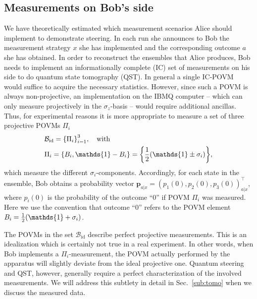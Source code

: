 \documentclass[aps,pra,twocolumn,superscriptaddress,showemail,showpacs,longbibliography]{revtex4-2}
\newcommand{\id}{\mathds{1}} %
\renewcommand{\vec}{\mathbf}
\begin{document}
\subsection{Measurements on Bob's side}
\label{sub:measurements-bob}
We have theoretically estimated which measurement scenarios Alice should implement to demonstrate steering. In each run she announces to Bob the measurement strategy $x$ she has implemented and the corresponding outcome $a$ she has obtained. In order to reconstruct the ensembles that Alice produces, Bob needs to implement an informationally complete (IC) set of measurements on his side to do quantum state tomography (QST). In general a single IC-POVM would suffice to acquire the necessary statistics. However, since such a POVM is always non-projective, an implementation on the IBMQ computer -- which can only measure projectively in the $\sigma_z$-basis --  would require additional ancillas. Thus, for experimental reasons it is more appropriate to measure a set of three projective POVMs $\Pi_i$
\begin{align}
\label{eq:ideal}
    & \mathcal{B}_\text{id} = \qty{\Pi_i}_{i=1}^3,\quad \textrm{with}\\
    & \Pi_i = \qty{B_i, \id-B_i} =  \qty{\frac{1}{2} \qty(\id \pm \sigma_i)}, %
\end{align}
which measure the different $\sigma_i$-components. Accordingly, for each state in the ensemble, Bob obtains a probability vector $\vec p_{a|x} = (p_1(0),p_2(0),p_3(0))^\intercal_{a|x}$, where $p_i(0)$ is the probability of the outcome ``0'' if POVM $\Pi_i$ was measured. Here we use the convention that outcome ``0'' refers to the POVM element $B_i = \frac{1}{2} \qty(\id + \sigma_i)$.

The POVMs in the set $\mathcal{B}_\text{id}$ describe perfect projective measurements. This is an idealization which is certainly not true in a real experiment. In other words, when Bob implements a $\Pi_i$-measurement, the POVM actually performed by the apparatus will slightly deviate from the ideal projective one. Quantum steering and QST, however, generally require a perfect characterization of the involved measurements. We will address this subtlety in detail in Sec.~\ref{sub:tomo} when we discuss the measured data.
\end{document}
